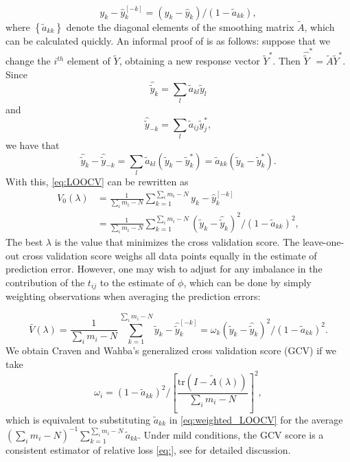 \documentclass[12pt]{article}
\newcommand{\tildeY}{\tilde{Y}}
\newcommand{\tildey}{\tilde{y}}
\newcommand{\tildeA}{\tilde{A}}
\theoremstyle{definition}
\begin{document}
\begin{equation} \label{eq:LOO_residual}
y_k - \hat{y}^{\left[-k\right]}_{k} = \left(y_k - \hat{y}_{k}\right)/\left(1-\tilde{a}_{kk}\right),
\end{equation}
\noindent
where $\left\{\tilde{a}_{kk}\right\}$ denote the diagonal elements of the smoothing matrix $\tildeA$, which can be calculated quickly. An informal proof of \label{eq:LOO_residual} is as follows: suppose that we change the $i^{th}$ element of $\tildeY$, obtaining a new response vector $\tildeY^*$. Then $\widehat{\tildeY}^* = \tildeA \tildeY^*$.  Since 
 \[
 \hat{\tildey}_k = \sum_{l} \tilde{a}_{kl} \tildey_l 
 \]
 \noindent 
 and 
 \[
 \hat{\tildey}_{-k} = \sum_{l} \tilde{a}_{ij} \tildey_j^*,
 \]
 \noindent
 we have that
 \[
 \hat{\tildey}_k - \hat{\tildey}_{-k} = \sum_l \tilde{a}_{kl} \left(\tildey_k - \tildey_k^*\right) = \tilde{a}_{kk} \left(\tildey_k - \tildey_k^*\right).  
\]
\noindent
With this, \ref{eq:LOOCV} can be rewritten as 
\begin{align*} 
V_0\left(\lambda\right) &= \frac{1}{{\sum_{i}m_i - N}} \sum_{k = 1}^{\sum_{i}m_i - N}  y_k - \hat{y}^{\left[-k\right]}_{k}\\
 &=  \frac{1}{{\sum_{i}m_i - N}} \sum_{k = 1}^{\sum_{i}m_i - N}  \left(\tildey_k - \hat{\tildey}_{k}\right)^2/\left(1-\tilde{a}_{kk}\right)^2 , 
\end{align*}
\noindent
The best $\lambda$ is the value that minimizes the cross validation score. The leave-one-out cross validation score weighs all data points equally in the estimate of prediction error. However, one may wish to adjust for any imbalance in the contribution of the $t_{ij}$ to the estimate of $\phi$, which can be done by simply weighting observations when averaging the prediction errors:
   
\begin{equation} \label{eq:weighted_LOOCV} 
\bar{V}\left(\lambda\right) = \frac{1}{\sum_{i}m_i - N} \sum_{k = 1}^{\sum_{i}m_i - N}  \tildey_k - \hat{\tildey}^{\left[-k\right]}_{k} = \omega_k \left(\tildey_k - \hat{\tildey}_{k}\right)^2/\left(1-\tilde{a}_{kk}\right)^2 . 
\end{equation}
\noindent
We obtain Craven and Wahba's generalized cross validation score (GCV) if we take
\[
\omega_i = \left(1 - \tilde{a}_{kk}\right)^2/\left[\frac{\mbox{tr}\left( I - \tildeA\left(\lambda\right)\right)}{\sum_{i}m_i - N}\right]^2,
\]
which is equivalent to substituting $\tilde{a}_{kk}$ in \ref{eq:weighted_LOOCV} for the average $\left(\sum_{i}m_i - N \right)^{-1} \sum_{k=1}^{\sum_{i}m_i - N} \tilde{a}_{kk}$. Under mild conditions, the GCV score is a consistent estimator of relative loss \ref{eq:}, see \citet{craven1978smoothing} for detailed discussion.
  
\end{document}

